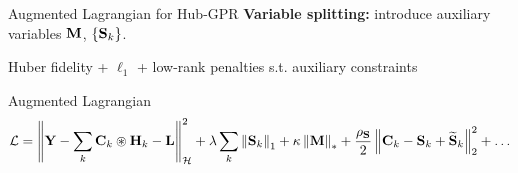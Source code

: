 \begin{frame}{Augmented Lagrangian for Hub-GPR \skipbadge{}}
  \small
  \textbf{Variable splitting:} introduce auxiliary variables
  $\mathbf{M}$, $\{\mathbf{S}_{k}\}$.

  \vspace{0.2em}
  \begin{shibuiframe}{ }
    \small
    Huber fidelity + $\ell_1$ + low-rank penalties
    \quad s.t. auxiliary constraints
  \end{shibuiframe}

  \vspace{0.3em}
  \begin{shibuiframe}{Augmented Lagrangian}
    \small
    \[
      \mathcal{L} = \left\| \mathbf{Y} - \sum_{k}\mathbf{C}_{k}\circledast\mathbf{H}_{k} - \mathbf{L} \right\|_{\mathcal{H}}^{2}
         + \lambda\sum_{k}\left\| \mathbf{S}_{k} \right\|_{1} + \kappa\left\| \mathbf{M} \right\|_{*}
         + \frac{\rho_{\mathbf{S}}}{2}\left\| \mathbf{C}_{k} - \mathbf{S}_{k} + \widetilde{\mathbf{S}}_{k} \right\|_{2}^{2} + \ldots
    \]
  \end{shibuiframe}
\end{frame}

